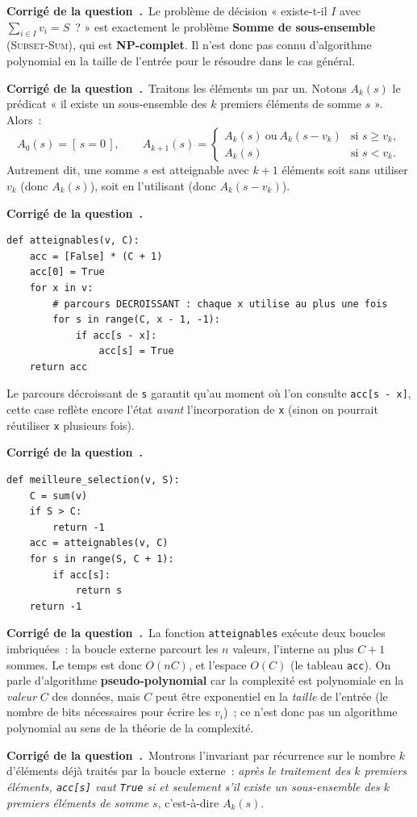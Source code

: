 \documentclass[11pt,a4paper]{article}
\newcounter{qcnt}
\newcommand{\Q}{\medskip\par\stepcounter{qcnt}\noindent\textbf{Corrigé de la question~\theqcnt.}~}
\newcommand{\code}[1]{\lstinline!#1!}
\begin{document}
\Q Le problème de décision « existe-t-il $I$ avec $\sum_{i\in I} v_i = S$~? » est exactement le problème \textbf{Somme de sous-ensemble} (\textsc{Subset-Sum}), qui est \textbf{NP-complet}. Il n'est donc pas connu d'algorithme polynomial en la taille de l'entrée pour le résoudre dans le cas général.

\Q Traitons les éléments un par un. Notons $A_k(s)$ le prédicat « il existe un sous-ensemble des $k$ premiers éléments de somme $s$ ». Alors~:
\[
  A_0(s) = [\,s = 0\,], \qquad
  A_{k+1}(s) =
  \begin{cases}
    A_k(s) \ \text{ou}\ A_k(s - v_k) & \text{si } s \ge v_k,\\[3pt]
    A_k(s) & \text{si } s < v_k.
  \end{cases}
\]
Autrement dit, une somme $s$ est atteignable avec $k+1$ éléments soit sans utiliser $v_k$ (donc $A_k(s)$), soit en l'utilisant (donc $A_k(s-v_k)$).

\Q
\begin{lstlisting}
def atteignables(v, C):
    acc = [False] * (C + 1)
    acc[0] = True
    for x in v:
        # parcours DECROISSANT : chaque x utilise au plus une fois
        for s in range(C, x - 1, -1):
            if acc[s - x]:
                acc[s] = True
    return acc
\end{lstlisting}
Le parcours décroissant de \code{s} garantit qu'au moment où l'on consulte \code{acc[s - x]}, cette case reflète encore l'état \emph{avant} l'incorporation de \code{x} (sinon on pourrait réutiliser \code{x} plusieurs fois).

\Q
\begin{lstlisting}
def meilleure_selection(v, S):
    C = sum(v)
    if S > C:
        return -1
    acc = atteignables(v, C)
    for s in range(S, C + 1):
        if acc[s]:
            return s
    return -1
\end{lstlisting}

\Q La fonction \code{atteignables} exécute deux boucles imbriquées~: la boucle externe parcourt les $n$ valeurs, l'interne au plus $C+1$ sommes. Le temps est donc $O(nC)$, et l'espace $O(C)$ (le tableau \code{acc}). On parle d'algorithme \textbf{pseudo-polynomial} car la complexité est polynomiale en la \emph{valeur} $C$ des données, mais $C$ peut être exponentiel en la \emph{taille} de l'entrée (le nombre de bits nécessaires pour écrire les $v_i$)~; ce n'est donc pas un algorithme polynomial au sens de la théorie de la complexité.

\Q Montrons l'invariant par récurrence sur le nombre $k$ d'éléments déjà traités par la boucle externe~: \emph{après le traitement des $k$ premiers éléments, \code{acc[s]} vaut \code{True} si et seulement s'il existe un sous-ensemble des $k$ premiers éléments de somme $s$}, c'est-à-dire $A_k(s)$.
\end{document}
